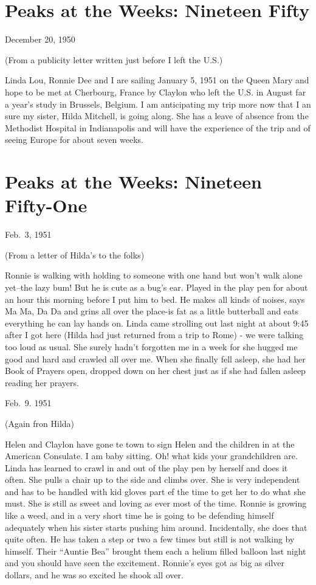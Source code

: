 \documentclass[]{book}
\begin{document}
\hypertarget{peaks-at-the-weeks-nineteen-fifty}{%
\chapter{Peaks at the Weeks: Nineteen Fifty}\label{peaks-at-the-weeks-nineteen-fifty}}

December 20, 1950

(From a publicity letter written just before I left the U.S.)

Linda Lou, Ronnie Dee and I are sailing January 5, 1951 on the Queen Mary and hope to be met at Cherbourg, France by Claylon who left the U.S. in August far a year's study in Brussels, Belgium. I am anticipating my trip more now that I an sure my sister, Hilda Mitchell, is going along. She has a leave of absence from the Methodist Hospital in Indianapolis and will have the experience of the trip and of seeing Europe for about seven weeks.

\hypertarget{peaks-at-the-weeks-nineteen-fifty-one}{%
\chapter{Peaks at the Weeks: Nineteen Fifty-One}\label{peaks-at-the-weeks-nineteen-fifty-one}}

Feb.~3, 1951

(From a letter of Hilda's to the folks)

Ronnie is walking with holding to someone with one hand but won't walk alone yet--the lazy bum! But he is cute as a bug's ear. Played in the play pen for about an hour this morning before I put him to bed. He makes all kinds of noises, says Ma Ma, Da Da and grins all over the place-is fat as a little butterball and eats everything he can lay hands on. Linda came strolling out last night at about 9:45 after I got here (Hilda had just returned from a trip to Rome) - we were talking too loud as usual. She surely hadn't forgotten me in a week for she hugged me good and hard and crawled all over me. When she finally fell asleep, she had her Book of Prayers open, dropped down on her chest just as if she had fallen asleep reading her prayers.

Feb.~9. 1951

(Again fron Hilda)

Helen and Claylon have gone te town to sign Helen and the children in at the American Consulate. I am baby sitting. Oh! what kids your grandchildren are. Linda has learned to crawl in and out of the play pen by herself and does it often. She pulls a chair up to the side and climbs over. She is very independent and has to be handled with kid gloves part ef the time to get her to do what she must. She is still as sweet and loving as ever most of the time. Ronnie is growing like a weed, and in a very short time he is going to be defending himself adequately when his sister starts pushing him around. Incidentally, she does that quite often. He has taken a step or two a few times but still is not walking by himself. Their ``Auntie Bea'' brought them each a helium filled balloon last night and you should have seen the excitement. Ronnie's eyes got as big as silver dollars, and he was so excited he shook all over.
\end{document}
